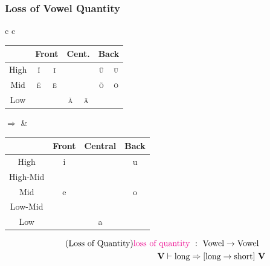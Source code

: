 \documentclass{report}[12pt]
\begin{document}
\subsubsection{Loss of Vowel Quantity}\label{sec:loss_of_quantity}

\begin{tcolorbox}
  \begin{tabular}{c c}
    \begin{tabular}{|c|c|c|c|c|c|c|}
      \hline
      & \multicolumn{2}{c|}{Front} & \multicolumn{2}{c|}{Cent.} & \multicolumn{2}{c|}{Back} \\
      \hline
      High & \cellcolor{gray} \textsc{\u{i}} & \textsc{\={i}} & & & \cellcolor{gray} \textsc{\u{u}} & \textsc{\={u}} \\
      \hline
      Mid & \cellcolor{gray} \textsc{\u{e}} & \textsc{\={e}} & & & \cellcolor{gray} \textsc{\u{o}} & \textsc{\={o}} \\
      \hline
      Low &  &  & \cellcolor{gray} \textsc{\u{a}} & \textsc{\={a}} & & \\
      \hline
    \end{tabular}
    \quad $\Rightarrow$ & 
                          \begin{tabular}{|c|c|c|c|}
                            \hline
                            & Front & Central & Back \\
                            \hline
                            High & i & & u \\
                            \hline
                            High-Mid & \cellcolor{magenta} \textipa{I} & & \cellcolor{magenta} \textipa{U} \\
                            \hline
                            Mid & e & & o \\
                            \hline
                            Low-Mid & \cellcolor{magenta} \textipa{E} & & \cellcolor{magenta} \textipa{O} \\
                            \hline
                            Low & & a & \\
                            \hline
                          \end{tabular}
  \end{tabular}
  \tcblower
  \begin{align*}\tag{Loss of Quantity}\label{eq:loss_of_quantity}
    \text{\textcolor{magenta}{loss of quantity}} &\ :\ \text{Vowel} \rightarrow \text{Vowel} \\
    \textbf{V} \vdash \text{long} & \Rightarrow [\text{long} \rightarrow \text{short}]\ \textbf{V} \\

\end{align*}
\end{tcolorbox}
\end{document}

